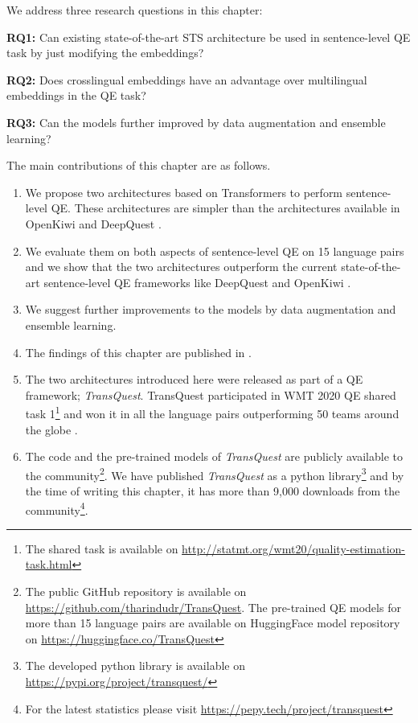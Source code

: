 We address three research questions in this chapter:

\textbf{RQ1:} Can existing state-of-the-art STS architecture be used in sentence-level QE task by just modifying the embeddings?

\textbf{RQ2:} Does crosslingual embeddings have an advantage over multilingual embeddings in the QE task?

\textbf{RQ3:} Can the models further improved by data augmentation and ensemble learning?

     
The main contributions of this chapter are as follows.
\begin{enumerate}
	\item We propose two architectures based on Transformers to perform sentence-level QE. These architectures are simpler than the  architectures available in OpenKiwi and DeepQuest \cite{lee-2020-two, wang-etal-2018-alibaba}. 
	
	\item We evaluate them on both aspects of sentence-level QE on 15 language pairs and we show that the two architectures outperform the current state-of-the-art sentence-level QE frameworks like DeepQuest \cite{ive-etal-2018-deepquest} and OpenKiwi \cite{kepler-etal-2019-openkiwi}.
	
	\item We suggest further improvements to the models by data augmentation and ensemble learning.
	
	\item The findings of this chapter are published in \citet{ranasinghe-etal-2020-transquest}. 
	
	\item The two architectures introduced here were released as part of a QE framework; \textit{TransQuest}. TransQuest participated in WMT 2020 QE shared task 1\footnote{The shared task is available on \url{http://statmt.org/wmt20/quality-estimation-task.html}} \cite{specia-etal-2020-findings-wmt} and won it in all the language pairs outperforming 50 teams around the globe \cite{ranasinghe-etal-2020-transquest-wmt2020}.
	
	\item The code and the pre-trained models of \textit{TransQuest} are publicly available to the community\footnote{The public GitHub repository is available on \url{https://github.com/tharindudr/TransQuest}. The pre-trained QE models for more than 15 language pairs are available on HuggingFace model repository on \url{https://huggingface.co/TransQuest}}. We have published \textit{TransQuest} as a python library\footnote{The developed python library is available on \url{https://pypi.org/project/transquest/}} and by the time of writing this chapter, it has more than 9,000 downloads from the community\footnote{For the latest statistics please visit \url{https://pepy.tech/project/transquest}}. 
	
\end{enumerate}


